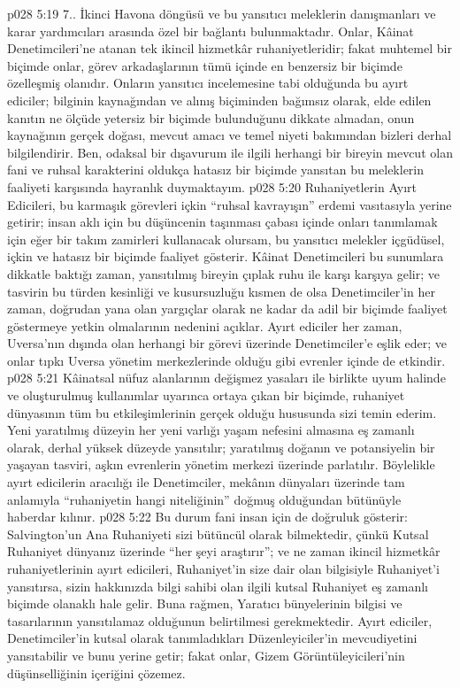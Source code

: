 \vs p028 5:19 7.\bibnobreakspace {}. İkinci Havona döngüsü ve bu yansıtıcı meleklerin danışmanları ve karar yardımcıları arasında özel bir bağlantı bulunmaktadır. Onlar, Kâinat Denetimcileri’ne atanan tek ikincil hizmetkâr ruhaniyetleridir; fakat muhtemel bir biçimde onlar, görev arkadaşlarının tümü içinde en benzersiz bir biçimde özelleşmiş olanıdır. Onların yansıtıcı incelemesine tabi olduğunda bu ayırt ediciler; bilginin kaynağından ve alınış biçiminden bağımsız olarak, elde edilen kanıtın ne ölçüde yetersiz bir biçimde bulunduğunu dikkate almadan, onun kaynağının gerçek doğası, mevcut amacı ve temel niyeti bakımından bizleri derhal bilgilendirir. Ben, odaksal bir dışavurum ile ilgili herhangi bir bireyin mevcut olan fani ve ruhsal karakterini oldukça hatasız bir biçimde yansıtan bu meleklerin faaliyeti karşısında hayranlık duymaktayım.
\vs p028 5:20 Ruhaniyetlerin Ayırt Edicileri, bu karmaşık görevleri içkin “ruhsal kavrayışın” erdemi vasıtasıyla yerine getirir; insan aklı için bu düşüncenin taşınması çabası içinde onları tanımlamak için eğer bir takım zamirleri kullanacak olursam, bu yansıtıcı melekler içgüdüsel, içkin ve hatasız bir biçimde faaliyet gösterir. Kâinat Denetimcileri bu sunumlara dikkatle baktığı zaman, yansıtılmış bireyin çıplak ruhu ile karşı karşıya gelir; ve tasvirin bu türden kesinliği ve kusursuzluğu kısmen de olsa Denetimciler’in her zaman, doğrudan yana olan yargıçlar olarak ne kadar da adil bir biçimde faaliyet göstermeye yetkin olmalarının nedenini açıklar. Ayırt ediciler her zaman, Uversa’nın dışında olan herhangi bir görevi üzerinde Denetimciler’e eşlik eder; ve onlar tıpkı Uversa yönetim merkezlerinde olduğu gibi evrenler içinde de etkindir.
\vs p028 5:21 Kâinatsal nüfuz alanlarının değişmez yasaları ile birlikte uyum halinde ve oluşturulmuş kullanımlar uyarınca ortaya çıkan bir biçimde, ruhaniyet dünyasının tüm bu etkileşimlerinin gerçek olduğu hususunda sizi temin ederim. Yeni yaratılmış düzeyin her yeni varlığı yaşam nefesini almasına eş zamanlı olarak, derhal yüksek düzeyde yansıtılır; yaratılmış doğanın ve potansiyelin bir yaşayan tasviri, aşkın evrenlerin yönetim merkezi üzerinde parlatılır. Böylelikle ayırt edicilerin aracılığı ile Denetimciler, mekânın dünyaları üzerinde tam anlamıyla “ruhaniyetin hangi niteliğinin” doğmuş olduğundan bütünüyle haberdar kılınır.
\vs p028 5:22 Bu durum fani insan için de doğruluk gösterir: Salvington’un Ana Ruhaniyeti sizi bütüncül olarak bilmektedir, çünkü Kutsal Ruhaniyet dünyanız üzerinde “her şeyi araştırır”; ve ne zaman ikincil hizmetkâr ruhaniyetlerinin ayırt edicileri, Ruhaniyet’in size dair olan bilgisiyle Ruhaniyet’i yansıtırsa, sizin hakkınızda bilgi sahibi olan ilgili kutsal Ruhaniyet eş zamanlı biçimde olanaklı hale gelir. Buna rağmen, Yaratıcı bünyelerinin bilgisi ve tasarılarının yansıtılamaz olduğunun belirtilmesi gerekmektedir. Ayırt ediciler, Denetimciler’in kutsal olarak tanımladıkları Düzenleyiciler’in mevcudiyetini yansıtabilir ve bunu yerine getir; fakat onlar, Gizem Görüntüleyicileri’nin düşünselliğinin içeriğini çözemez.
